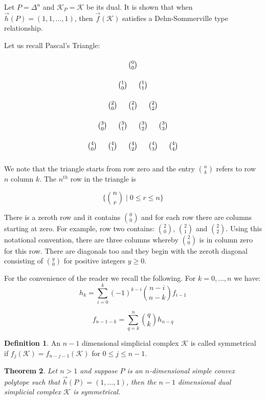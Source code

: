 \documentclass[oneside,12pt]{amsart}
\newtheorem{Theorem}{Theorem}[section]
\theoremstyle{definition}
\newtheorem{Definition}[Theorem]{Definition}
\numberwithin{equation}{section}
\begin{document}
Let $P = \Delta^n$ and $\mathcal{K}_P = \mathcal{K}$ be its dual. It is shown that when $\overrightarrow{h}(P) = (1,1,\ldots,1)$, then $\overrightarrow{f}(\mathcal{K})$ satisfies a Dehn-Sommerville type relationship.

Let us recall Pascal's Triangle:

\large
$$
\begin{tikzpicture}
\foreach \n in {0,...,4} {
  \foreach \k in {0,...,\n} {
    \node at (\k-\n/2,-\n) {${\n \choose \k}$};
  }
}
\end{tikzpicture}
$$
\normalsize

We note that the triangle starts from row zero and the entry $\binom{n}{k}$ refers to row $n$ column $k$. The $n^{th}$ row
in the triangle is


$$\bigg \{ \binom{n}{r} \; \bigg | \;  0 \leq r \leq n \bigg \}$$

There is a zeroth row and it contains $\binom{0}{0}$ and for each row there are columns starting at zero.  For example, row two contains: $\binom{2}{0}$, $\binom{2}{1}$ and $\binom{2}{2}$.  Using this notational convention, there are three columns whereby $\binom{2}{0}$ is in column zero for this row.  There are diagonals too and they begin with the zeroth diagonal consisting of $\binom{y}{0}$ for positive integers $y \geq 0$.

For the convenience of the reader we recall the following.  For $k = 0,\ldots,n$
we have:\\

$$h_k = \sum_{i = 0}^k (-1)^{k-i}\binom{n-i}{n-k}f_{i-1}$$

\vspace{.1in}
$$f_{n-1-k} = \sum_{q = k}^n \binom{q}{k}h_{n-q}$$

\begin{Definition}\label{symmetrical}
An $n-1$ dimensional simplicial complex $\mathcal{K}$ is called symmetrical if $f_j(\mathcal{K}) = f_{n-j-1}(\mathcal{K})$ for $0 \leq j \leq n-1$.
\end{Definition}

\begin{Theorem} \label{N simplex}
Let $n >1$ and suppose $P$ is an $n$-dimensional simple convex polytope such that $\overrightarrow{h}(P) = (1,\ldots,1)$, then the $n-1$ dimensional dual simplicial complex $\mathcal{K}$ is symmetrical.  %
\end{Theorem}
\end{document}
